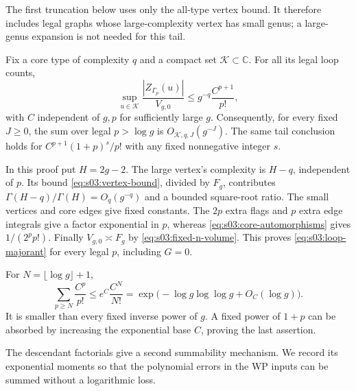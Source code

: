 The first truncation below uses only the all-type vertex bound. It
therefore includes legal graphs whose large-complexity vertex has
small genus; a large-genus expansion is not needed for this tail.

\begin{lmm}
\label{lmm:s03:loop-tail}
Fix a core type of complexity $q$ and a compact set
$\mathcal K\subset\mathbb C$. For all its legal loop counts,
\begin{equation}
\label{eq:s03:loop-majorant}
\sup_{u\in\mathcal K}
 \frac{|Z_{\Gamma_p}(u)|}{V_{g,0}}
\leq g^{-q}\frac{C^{p+1}}{p!},
\end{equation}
with $C$ independent of $g,p$ for sufficiently large $g$.
Consequently, for every fixed $J\geq0$, the sum over legal
$p>\log g$ is $O_{\mathcal K,q,J}(g^{-J})$.
The same tail conclusion holds for $C^{p+1}(1+p)^s/p!$ with any
fixed nonnegative integer $s$.
\end{lmm}
\begin{prf}
In this proof put $H=2g-2$. The large vertex's complexity is
$H-q$, independent of $p$. Its bound
\eqref{eq:s03:vertex-bound}, divided by $F_g$, contributes
$\Gamma(H-q)/\Gamma(H)=O_q(g^{-q})$ and a bounded square-root
ratio. The small vertices and core edges give fixed constants.
The $2p$ extra flags and $p$ extra edge integrals give a factor
exponential in $p$, whereas \eqref{eq:s03:core-automorphisms}
gives $1/(2^pp!)$. Finally $V_{g,0}\asymp F_g$ by
\eqref{eq:s03:fixed-n-volume}. This proves
\eqref{eq:s03:loop-majorant} for every legal $p$, including $G=0$.

For $N=\lfloor\log g\rfloor+1$,
\[
\sum_{p\geq N}\frac{C^p}{p!}
\leq e^C\frac{C^N}{N!}
=\exp\bigl(-\log g\log\log g+O_C(\log g)\bigr).
\]
It is smaller than every fixed inverse power of $g$.
A fixed power of $1+p$ can be absorbed by increasing the exponential
base $C$, proving the last assertion.
\end{prf}

The descendant factorials give a second summability mechanism. We
record its exponential moments so that the polynomial errors in
the WP inputs can be summed without a logarithmic loss.

